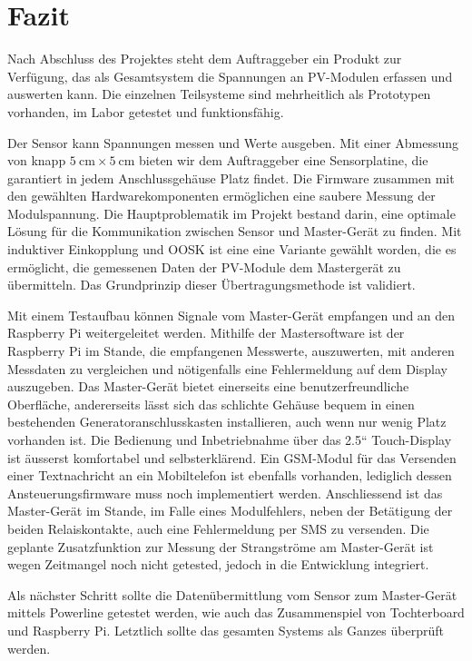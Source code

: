 \chapter{Fazit}
\label{chap:fazit}
\enlargethispage{4em}

\vspace*{-2em}
Nach  Abschluss  des   Projektes  steht  dem  Auftraggeber   ein  Produkt  zur
Verf\"ugung, das  als Gesamtsystem die  Spannungen an PV-Modulen  erfassen und
auswerten  kann. Die einzelnen  Teilsysteme sind  mehrheitlich als  Prototypen
vorhanden, im Labor getestet und funktionsf\"ahig.

Der  Sensor kann  Spannungen messen  und Werte  ausgeben. Mit einer  Abmessung
von  knapp  $\SI{5}{\centi\meter}\times\SI{5}{\centi\meter}$  bieten  wir  dem
Auftraggeber eine  Sensorplatine, die  garantiert in  jedem Anschlussgeh\"ause
Platz findet. Die  Firmware zusammen  mit den  gew\"ahlten Hardwarekomponenten
erm\"oglichen eine saubere Messung  der Modulspannung. Die Hauptproblematik im
Projekt bestand darin, eine optimale L\"osung f\"ur die Kommunikation zwischen
Sensor und Master-Ger\"at  zu finden. Mit induktiver Einkopplung  und OOSK ist
eine eine Variante gew\"ahlt worden, die es erm\"oglicht, die gemessenen Daten
der  PV-Module dem  Masterger\"at  zu  \"ubermitteln. Das Grundprinzip  dieser
\"Ubertragungsmethode ist validiert.

Mit einem Testaufbau k\"onnen Signale  vom Master-Ger\"at empfangen und an den
Raspberry  Pi  weitergeleitet  werden. Mithilfe  der  Mastersoftware  ist  der
Raspberry Pi  im Stande, die  empfangenen Messwerte, auszuwerten,  mit anderen
Messdaten zu vergleichen und n\"otigenfalls eine Fehlermeldung auf dem Display
auszugeben. Das  Master-Ger\"at  bietet  einerseits  eine  benutzerfreundliche
Oberfl\"ache,  andererseits l\"asst  sich  das schlichte  Geh\"ause bequem  in
einen bestehenden  Generatoranschlusskasten installieren, auch wenn  nur wenig
Platz  vorhanden  ist. Die  Bedienung  und  Inbetriebnahme  \"uber  das  2.5``
Touch-Display ist \"ausserst komfortabel und selbsterkl\"arend.  Ein GSM-Modul
f\"ur  das Versenden  einer Textnachricht  an ein  Mobiltelefon ist  ebenfalls
vorhanden,  lediglich  dessen  Ansteuerungsfirmware  muss  noch  implementiert
werden. Anschliessend  ist  das  Master-Ger\"at  im  Stande,  im  Falle  eines
Modulfehlers,  neben der  Bet\"atigung  der beiden  Relaiskontakte, auch  eine
Fehlermeldung per  SMS zu  versenden. Die geplante Zusatzfunktion  zur Messung
der Strangstr\"ome am Master-Ger\"at ist wegen Zeitmangel noch nicht getested,
jedoch in die Entwicklung integriert.

Als  n\"achster   Schritt  sollte  die  Daten\"ubermittlung   vom  Sensor  zum
Master-Ger\"at mittels  Powerline getestet werden, wie  auch das Zusammenspiel
von Tochterboard und  Raspberry Pi. Letztlich sollte das  gesamten Systems als
Ganzes \"uberpr\"uft werden.
